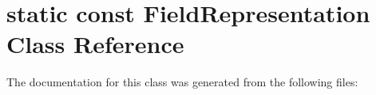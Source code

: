 \hypertarget{classstatic_01const_01FieldRepresentation}{}\section{static const Field\+Representation Class Reference}
\label{classstatic_01const_01FieldRepresentation}


The documentation for this class was generated from the following files\+: